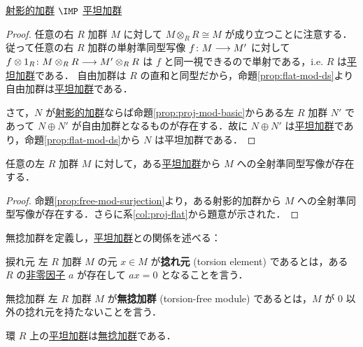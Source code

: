 \documentclass[algtopo_main]{subfiles}
\begin{document}
\begin{mycol}[label=col:proj-flat]{}
    \hyperref[def:proj-mod]{射影的加群} $\IMP$ \hyperref[def:flat-mod]{平坦加群}
\end{mycol}

\begin{proof}
    任意の右 $R$ 加群 $M$ に対して $M \otimes_R R \cong M$ が成り立つことに注意する．従って任意の右 $R$ 加群の単射準同型写像 $f \colon M \longrightarrow M'$ に対して $ f \otimes 1_R \colon M \otimes_R R \longrightarrow M' \otimes_R R$ は $f$ と同一視できるので単射である，i.e. $R$ は\hyperref[def:flat-mod]{平坦加群}である．
    自由加群は $R$ の直和と同型だから，命題\ref{prop:flat-mod-ds}より自由加群は\hyperref[def:flat-mod]{平坦加群}である．

    さて，$N$ が\hyperref[def:proj-mod]{射影的加群}ならば命題\ref{prop:proj-mod-basic}からある左 $R$ 加群 $N'$ であって $N \oplus N'$ が自由加群となるものが存在する．故に $N \oplus N'$ は\hyperref[def:flat-mod]{平坦加群}であり，命題\ref{prop:flat-mod-ds}から $N$ は平坦加群である．
\end{proof}


\begin{mycol}[label=col:flat-mod-surjection]{}
    任意の左 $R$ 加群 $M$ に対して，ある\hyperref[def:flat-mod]{平坦加群}から $M$ への全射準同型写像が存在する．
\end{mycol}

\begin{proof}
    命題\ref{prop:free-mod-surjection}より，ある射影的加群から $M$ への全射準同型写像が存在する．さらに系\ref{col:proj-flat}から題意が示された．
\end{proof}


無捻加群を定義し，\hyperref[def:flat-mod]{平坦加群}との関係を述べる：

\begin{mydef}[label=def:torsion]{捩れ元}
    左 $R$ 加群 $M$ の元 $x \in M$ が\textbf{捻れ元} (torsion element) であるとは，ある $R$ の\hyperref[def:non-zero-diviser]{非零因子} $a$ が存在して $ax = 0$ となることを言う．
\end{mydef}


\begin{mydef}[label=def:torsion-free-mod]{無捻加群}
    左 $R$ 加群 $M$ が\textbf{無捻加群} (torsion-free module) であるとは，$M$ が $0$ 以外の捻れ元を持たないことを言う．
\end{mydef}

\begin{myprop}[]{}
    環 $R$ 上の\hyperref[def:flat-mod]{平坦加群}は\hyperref[def:torsion-free-mod]{無捻加群}である．
\end{myprop}
\end{document}
